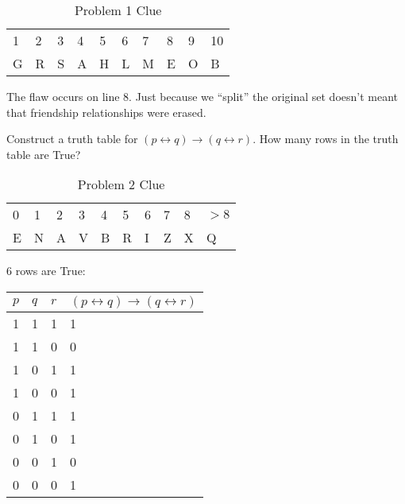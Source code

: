 \documentclass[solution, letterpaper]{cs20inclass}
\begin{document}
\begin{table}[h]
\centering
\begin{tabular}{llllllllll}
1 & 2 & 3 & 4 & 5 & 6 & 7 & 8 & 9 & 10 \\
G & R & S & A & H & L & M & E & O & B 
\end{tabular}
\caption{Problem 1 Clue}
\end{table}

\begin{solution}
The flaw occurs on line 8. Just because we ``split'' the original set doesn't meant that friendship relationships were erased. 
\end{solution}

\pagebreak

\problem Construct a truth table for $(p \leftrightarrow q) \to (q \leftrightarrow r)$. How many rows in the truth table are True?

\begin{table}[h]
\centering
\begin{tabular}{llllllllll}
0 & 1 & 2 & 3 & 4 & 5 & 6 & 7 & 8 & $>8$ \\
E & N & A & V & B & R & I & Z & X & Q            
\end{tabular}
\caption{Problem 2 Clue}
\end{table}

\begin{solution}

6 rows are True:

\begin{table}[h]
\centering
\begin{tabular}{|l|l|l|l|}
\hline
$p$ &$ q$ & $r$ & $(p \leftrightarrow q) \to (q \leftrightarrow r)$ \\ \hline
1 & 1 & 1 & 1                                               \\ \hline
1 & 1 & 0 & 0                                               \\ \hline
1 & 0 & 1 & 1                                               \\ \hline
1 & 0 & 0 & 1                                               \\ \hline
0 & 1 & 1 & 1                                               \\ \hline
0 & 1 & 0 & 1                                               \\ \hline
0 & 0 & 1 & 0                                               \\ \hline
0 & 0 & 0 & 1                                               \\ \hline
\end{tabular}
\end{table}
\end{solution}
\end{document}
